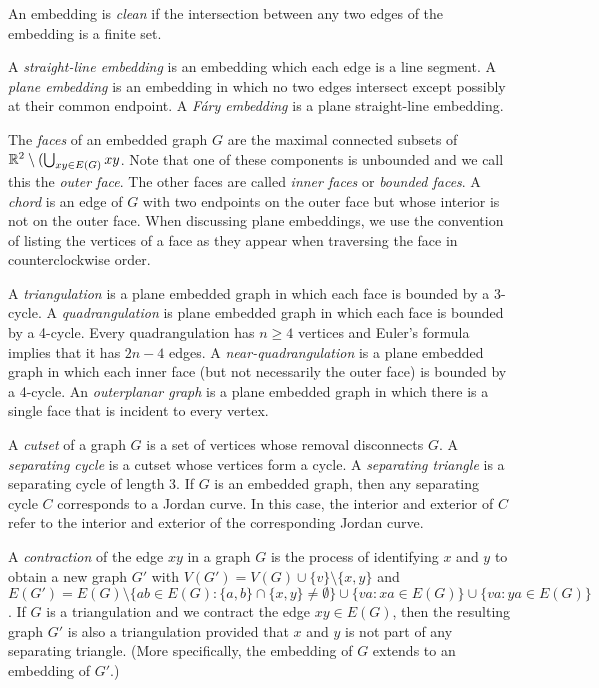 \documentclass{patmorin}
\begin{document}
An embedding is \emph{clean} if the intersection between any two edges
of the embedding is a finite set.  

A \emph{straight-line embedding} is an embedding which each edge is a
line segment.  A \emph{plane embedding} is an embedding in which no two
edges intersect except possibly at their common endpoint.  A \emph{Fáry
embedding} is a plane straight-line embedding.

The \emph{faces} of an embedded graph $G$ are the maximal connected
subsets of $\mathbb{R}^2\setminus(\bigcup_{xy\in E(G)} xy$.  Note that one of
these components is unbounded and we call this the \emph{outer face}. The
other faces are called \emph{inner faces} or \emph{bounded faces}.
A \emph{chord} is an edge of $G$ with two endpoints on the outer face but whose
interior is not on the outer face.  When discussing plane embeddings,
we use the convention of listing the vertices of a face as they appear
when traversing the face in counterclockwise order.

A \emph{triangulation} is a plane embedded graph in which each face is
bounded by a 3-cycle.  A \emph{quadrangulation} is plane embedded graph
in which each face is bounded by a 4-cycle. Every quadrangulation has
$n\ge 4$ vertices and Euler's formula implies that it has $2n-4$ edges.
A \emph{near-quadrangulation} is a plane embedded graph in which each
inner face (but not necessarily the outer face) is bounded by a 4-cycle.
An \emph{outerplanar graph} is a plane embedded graph in which there is
a single face that is incident to every vertex.

A \emph{cutset} of a graph $G$ is a set of vertices whose removal
disconnects $G$.  A \emph{separating cycle} is a cutset whose vertices
form a cycle.  A \emph{separating triangle} is a separating cycle of
length 3.  If $G$ is an embedded graph, then any separating cycle $C$
corresponds to a Jordan curve.  In this case, the interior and exterior of
$C$ refer to the interior and exterior of the corresponding Jordan curve.


A \emph{contraction} of the edge $xy$ in a graph $G$ is the
process of identifying $x$ and $y$ to obtain a new graph $G'$ with
$V(G')=V(G)\cup\{v\}\setminus\{x,y\}$ and $E(G')=E(G)\setminus\{ab\in
E(G): \{a,b\}\cap\{x,y\}\neq\emptyset\}\cup\{va: xa\in E(G)\}\cup
\{va:ya\in E(G)\}$.  If $G$ is a triangulation and we contract the edge
$xy\in E(G)$, then the resulting graph $G'$ is also a triangulation
provided that $x$ and $y$ is not part of any separating triangle. (More
specifically, the embedding of $G$ extends to an embedding of $G'$.)
\end{document}
